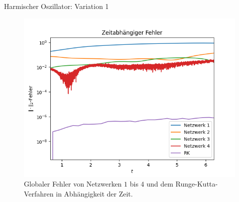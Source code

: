 \begin{frame}{Harmischer Oszillator: Variation 1}
    \begin{figure}
        \centering
        \includegraphics[scale=0.5]{images/harmonicoscillator_plots/harmonicoscillatorError_in_time_neurons_var}
        \caption{Globaler Fehler von Netzwerken $1$ bis $4$ und dem Runge-Kutta-Verfahren in Abhängigkeit der Zeit.}
        \label{fig:harmonic-neurons-variable-error-in-time}
    \end{figure}
\end{frame}

